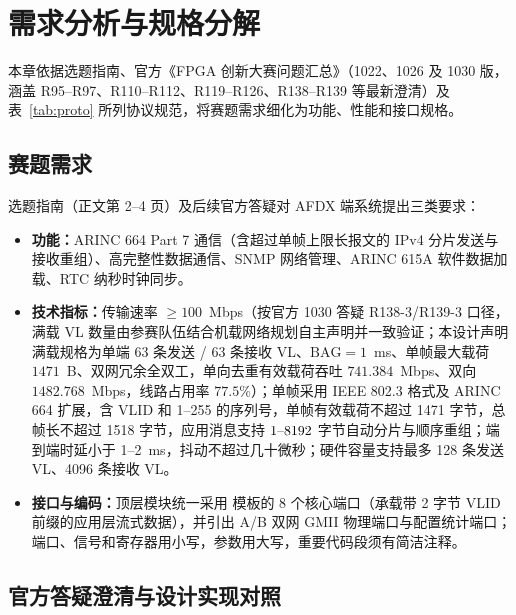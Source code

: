 \chapter{需求分析与规格分解}\label{ch:req}

本章依据选题指南、官方《FPGA 创新大赛问题汇总》（1022、1026 及 1030 版，涵盖 R95--R97、R110--R112、R119--R126、R138--R139 等最新澄清）及表~\ref{tab:proto} 所列协议规范，将赛题需求细化为功能、性能和接口规格。

\section{赛题需求}

选题指南（正文第 2--4 页）及后续官方答疑对 AFDX 端系统提出三类要求：
\begin{itemize}
  \item \textbf{功能：}ARINC 664 Part 7 通信（含超过单帧上限长报文的 IPv4 分片发送与接收重组）、高完整性数据通信、SNMP 网络管理、ARINC 615A 软件数据加载、RTC 纳秒时钟同步。
  \item \textbf{技术指标：}传输速率 $\ge 100$~Mbps（按官方 1030 答疑 R138-3/R139-3 口径，满载 VL 数量由参赛队伍结合机载网络规划自主声明并一致验证；本设计声明满载规格为单端 63 条发送 / 63 条接收 VL、$\text{BAG}=1$~ms、单帧最大载荷 $1471$~B、双网冗余全双工，单向去重有效载荷吞吐 $741.384$~Mbps、双向 $1482.768$~Mbps，线路占用率 $77.5\%$）；单帧采用 IEEE 802.3 格式及 ARINC 664 扩展，含 VLID 和 1--255 的序列号，单帧有效载荷不超过 1471 字节，总帧长不超过 1518 字节，应用消息支持 $1\text{--}8192$ 字节自动分片与顺序重组；端到端时延小于 1--2~ms，抖动不超过几十微秒；硬件容量支持最多 128 条发送 VL、4096 条接收 VL。
  \item \textbf{接口与编码：}顶层模块统一采用  模板的 8 个核心端口（承载带 2 字节 VLID 前缀的应用层流式数据），并引出 A/B 双网 GMII 物理端口与配置统计端口；端口、信号和寄存器用小写，参数用大写，重要代码段须有简洁注释。
\end{itemize}

\section{官方答疑澄清与设计实现对照}

